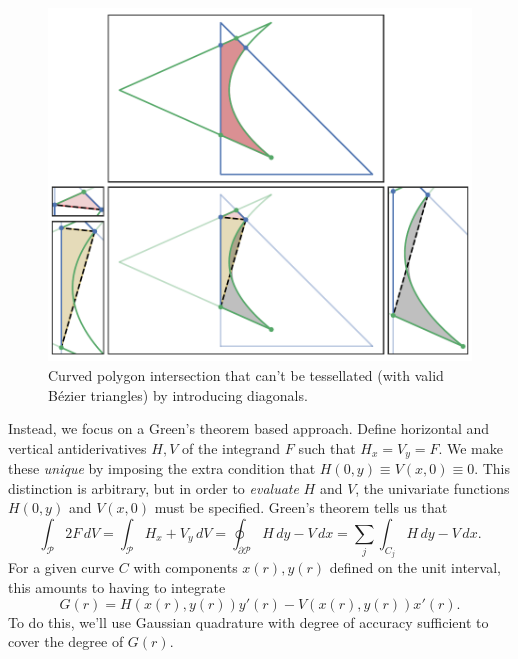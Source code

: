 \begin{figure}
  \includegraphics{../images/solution-transfer/main_figure16.pdf}
  \centering
  \captionsetup{width=.75\linewidth}
  \caption{Curved polygon intersection that can't be tessellated
    (with valid B\'{e}zier triangles) by introducing diagonals.}
  \label{fig:bad-tessellation-required}
\end{figure}

Instead, we focus on a Green's theorem based approach.
Define horizontal and vertical antiderivatives
\(H, V\) of the integrand \(F\) such that \(H_x = V_y = F\).
We make these \textit{unique} by imposing the
extra condition that \(H(0, y) \equiv V(x, 0) \equiv 0\).
This distinction is arbitrary, but in order to \textit{evaluate}
\(H\) and \(V\), the univariate functions \(H(0, y)\) and \(V(x, 0)\)
must be specified.
Green's theorem tells us that
\begin{equation}
\int_{\mathcal{P}} 2 F \, dV =
\int_{\mathcal{P}} H_x + V_y \, dV =
\oint_{\partial \mathcal{P}} H \, dy - V \, dx =
\sum_j \int_{C_j} H \, dy - V \, dx.
\end{equation}
For a given curve \(C\) with components \(x(r), y(r)\)
defined on the unit interval, this amounts to having
to integrate
\begin{equation}
G(r) = H(x(r), y(r)) y'(r) - V(x(r), y(r)) x'(r).
\end{equation}
To do this, we'll use Gaussian
quadrature with degree of accuracy sufficient to cover the degree
of \(G(r)\).


